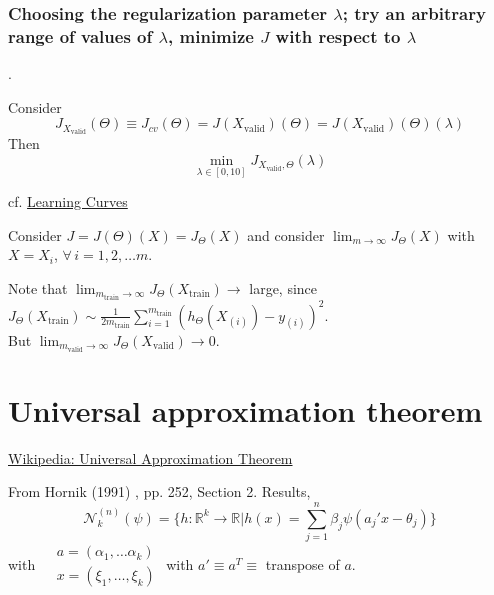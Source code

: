 \documentclass[10pt]{amsart}
\begin{document}
\begin{multicols*}{2}
\subsubsection{Choosing the regularization parameter $\lambda$; try an arbitrary range of values of $\lambda$, minimize $J$ with respect to $\lambda$}.  

Consider
\[
J_{X_{\text{valid}}}(\Theta) \equiv J_{cv}(\Theta) = J(X_{\text{valid}})(\Theta) = J(X_{\text{valid}})(\Theta)(\lambda)
\]
Then 
\[
\min_{\lambda \in [0,10] }J_{X_{\text{valid}},\Theta}(\lambda)
\]

cf. \href{https://www.coursera.org/learn/machine-learning/lecture/Kont7/learning-curves}{Learning Curves}

Consider $J=J(\Theta)(X) = J_{\Theta}(X)$ and consider $\lim_{m\to \infty} J_{\Theta}(X)$ with $X= X_i$, $\forall \, i =1,2,\dots m$.  

Note that $\lim_{m_{\text{train}}\to \infty} J_{\Theta}(X_{\text{train}}) \to $ large, since $J_{\Theta}(X_{\text{train}}) \sim \frac{1}{2m_{\text{train}}} \sum_{i=1}^{m_{\text{train}}} (h_{\Theta}(X_{(i)}) -y_{(i)})^2$.  \\
But $\lim_{m_{\text{valid}} \to \infty} J_{\Theta}(X_{\text{valid}}) \to 0$.  




\section{Universal approximation theorem}

\href{https://en.wikipedia.org/wiki/Universal_approximation_theorem}{Wikipedia: Universal Approximation Theorem}

From Hornik (1991) \cite{Horn1991}, pp. 252, Section 2. Results,
\begin{equation}
  \mathcal{N}_k^{(n)}(\psi)  = \lbrace h :\mathbb{R}^k \to \mathbb{R} | h(x) =\sum_{j=1}^n \beta_j \psi(a_j'x- \theta_j) \rbrace
\end{equation}
with
$\begin{aligned}
  & a = (\alpha_1 , \dots \alpha_k) \\ 
 & x = ( \xi_1, \dots, \xi_k) 
  \end{aligned}
$ with $a' \equiv a^T \equiv $ transpose of $a$.  


\end{multicols*}
\end{document}

